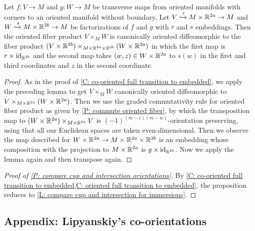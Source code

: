 \begin{corollary}\label{C: oriented full transition to embedded}
	Let $f \colon V \to M$ and $g \colon W \to M$ be transverse maps from oriented manifolds with corners to an oriented manifold without boundary.
	Let $V\xhookrightarrow{r} M \times \mathbb{R}^{2a} \to M$ and $W\xhookrightarrow{s} M \times \mathbb{R}^{2b} \to M$ be factorizations of $f$ and $g$ with $r$ and $s$ embeddings.
	Then the oriented fiber product $V \times_M W$ is canonically oriented diffeomorphic to the fiber product $(V \times \mathbb{R}^{2b})\times_{M \times \mathbb{R}^{2a} \times \mathbb{R}^{2b}}(W \times \mathbb{R}^{2a})$ in which the first map is $r \times \mathrm{id}_{\mathbb{R}^{2b}}$ and the second map takes $(w,z) \in W \times \mathbb{R}^{2a}$ to $s(w)$ in the first and third coordinates and $z$ in the second coordinate.
\end{corollary}

\begin{proof}
	As in the proof of \cref{C: co-oriented full transition to embedded},
	we apply the preceding lemma to get $V \times_M W$ canonically oriented diffeomorphic to $V\times_{M \times \mathbb{R}^{2a}}(W \times \mathbb{R}^{2a})$.
	Then we use the graded commutativity rule for oriented fiber product as given by \cref{P: commute oriented fiber},
	by which
	the transposition map to $(W \times \mathbb{R}^{2a})\times_{M \times \mathbb{R}^{2a}}V$ is $(-1)^{(m-v)(m-w)}$-orientation preserving, using that all our Euclidean spaces are taken even-dimensional.
	Then we observe the map described for $W \times \mathbb{R}^{2a} \to M \times \mathbb{R}^{2a} \times \mathbb{R}^{2b}$ is an embedding whose composition with the projection to $M \times \mathbb{R}^{2a}$ is $g \times \mathrm{id}_{\mathbb{R}^{2b}}$.
	Now we apply the lemma again and then transpose again.
\end{proof}

\begin{proof}[Proof of \cref{P: compare cup and intersection orientations}]
	By \cref{C: co-oriented full transition to embedded,C: oriented full transition to embedded}, the proposition reduces to \cref{L: compare cup and intersection for immersions}.
\end{proof}

\subsection{Appendix: Lipyanskiy's co-orientations}\label{S: Lipyanskiy co-orientations}

